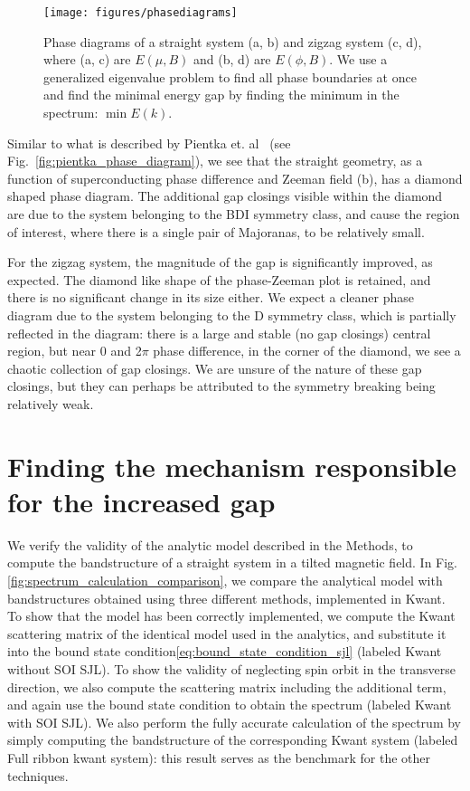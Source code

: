 			\begin{figure}[!htb]
			\centering
			\texttt{[image: figures/phasediagrams]}
			\caption{Phase diagrams of a straight system (a, b) and zigzag system (c, d), where (a, c) are $E(\mu, B)$ and (b, d) are $E(\phi, B)$.
			We use a generalized eigenvalue problem to find all phase boundaries at once and find the minimal energy gap by finding the minimum in the spectrum: $\min{E(k)}$.
			\label{fig:phasediagrams}}
			\end{figure}

			Similar to what is described by Pientka et. al~\cite{pientka2017topological} (see Fig.~\ref{fig:pientka_phase_diagram}), we see that the straight geometry, as a function of superconducting phase difference and Zeeman field (b), has a diamond shaped phase diagram.
			The additional gap closings visible within the diamond are due to the system belonging to the BDI symmetry class, and cause the region of interest, where there is a single pair of Majoranas, to be relatively small.
			
			For the zigzag system, the magnitude of the gap is significantly improved, as expected.
			The diamond like shape of the phase-Zeeman plot is retained, and there is no significant change in its size either.
			We expect a cleaner phase diagram due to the system belonging to the D symmetry class, which is partially reflected in the diagram: there is a large and stable (no gap closings) central region, but near 0 and 2$\pi$ phase difference, in the corner of the diamond, we see a chaotic collection of gap closings.
			We are unsure of the nature of these gap closings, but they can perhaps be attributed to the symmetry breaking being relatively weak.



	\section{Finding the mechanism responsible for the increased gap}
		We verify the validity of the analytic model described in the Methods, to compute the bandstructure of a straight system in a tilted magnetic field. 
		In Fig.\ref{fig:spectrum_calculation_comparison}, we compare the analytical model with bandstructures obtained using three different methods, implemented in Kwant.
		To show that the model has been correctly implemented, we compute the Kwant scattering matrix of the identical model used in the analytics, and substitute it into the bound state condition\eqref{eq:bound_state_condition_sjl} (labeled Kwant without SOI SJL).
		To show the validity of neglecting spin orbit in the transverse direction, we also compute the scattering matrix including the additional term, and again use the bound state condition to obtain the spectrum (labeled Kwant with SOI SJL).
		We also perform the fully accurate calculation of the spectrum by simply computing the bandstructure of the corresponding Kwant system (labeled Full ribbon kwant system): this result serves as the benchmark for the other techniques.

